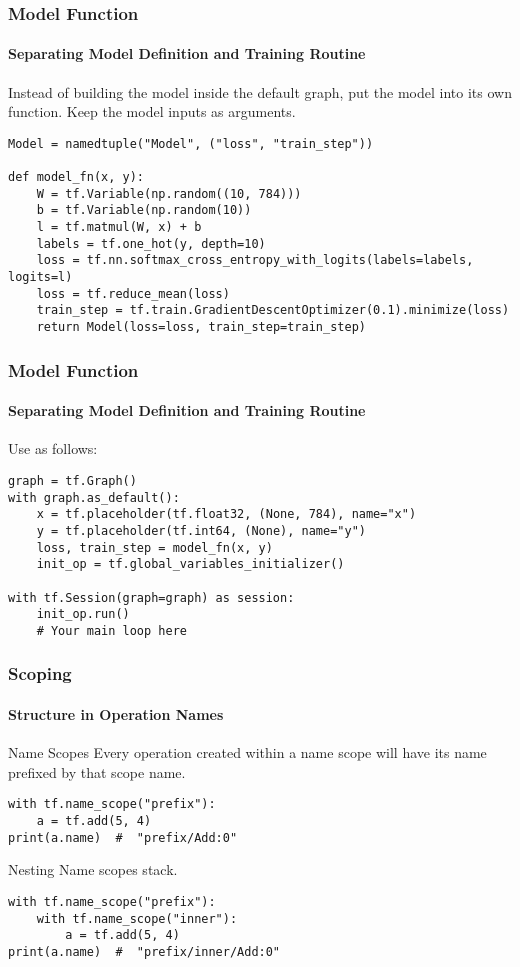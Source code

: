 \begin{frame}[fragile]
    \frametitle{Model Function}
    \framesubtitle{Separating Model Definition and Training Routine}
        Instead of building the model inside the default graph, put the model into its own function.
        Keep the model inputs as arguments.
    \begin{lstlisting}
Model = namedtuple("Model", ("loss", "train_step"))

def model_fn(x, y):
    W = tf.Variable(np.random((10, 784)))
    b = tf.Variable(np.random(10))
    l = tf.matmul(W, x) + b
    labels = tf.one_hot(y, depth=10)
    loss = tf.nn.softmax_cross_entropy_with_logits(labels=labels, logits=l)
    loss = tf.reduce_mean(loss)
    train_step = tf.train.GradientDescentOptimizer(0.1).minimize(loss)
    return Model(loss=loss, train_step=train_step)
    \end{lstlisting}
\end{frame}


\begin{frame}[fragile]
    \frametitle{Model Function}
    \framesubtitle{Separating Model Definition and Training Routine}
    Use as follows:
    \begin{lstlisting}
graph = tf.Graph()
with graph.as_default():
    x = tf.placeholder(tf.float32, (None, 784), name="x")
    y = tf.placeholder(tf.int64, (None), name="y")  
    loss, train_step = model_fn(x, y)
    init_op = tf.global_variables_initializer()

with tf.Session(graph=graph) as session:
    init_op.run()
    # Your main loop here
    \end{lstlisting}
\end{frame}

\begin{frame}[fragile]
    \frametitle{Scoping}
    \framesubtitle{Structure in Operation Names}
    \begin{block}{Name Scopes}
        Every operation created within a name scope will have its name 
        prefixed by that scope name.
            \begin{lstlisting}
with tf.name_scope("prefix"):
    a = tf.add(5, 4)
print(a.name)  #  "prefix/Add:0"
    \end{lstlisting}
    \end{block}

    \begin{block}{Nesting}
        Name scopes stack.
    \begin{lstlisting}
with tf.name_scope("prefix"):
    with tf.name_scope("inner"):
        a = tf.add(5, 4)
print(a.name)  #  "prefix/inner/Add:0"
    \end{lstlisting}
    \end{block}
\end{frame}

